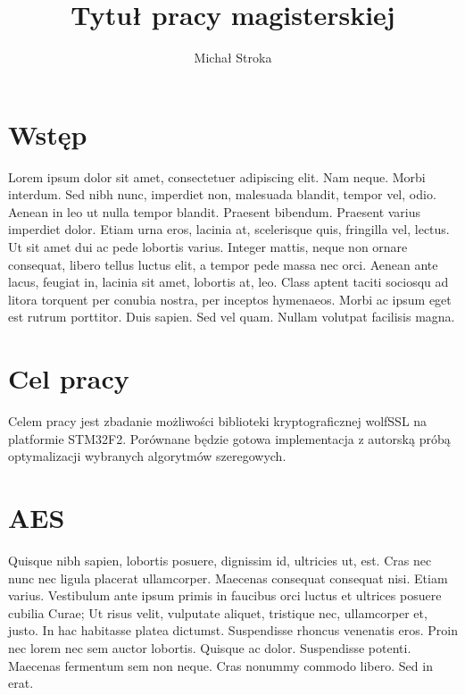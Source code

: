 \documentclass[printmode]{mgr}
\title{Tytuł pracy magisterskiej}
\author{Michał Stroka}
\begin{document}

\maketitle 

\tableofcontents %

\chapter{Wstęp}
Lorem ipsum dolor sit amet, consectetuer adipiscing elit. Nam
neque. Morbi interdum. Sed nibh nunc, imperdiet non, malesuada
blandit, tempor vel, odio. Aenean in leo ut nulla tempor
blandit. Praesent bibendum. Praesent varius imperdiet dolor. Etiam
urna eros, lacinia at, scelerisque quis, fringilla vel, lectus. Ut sit
amet dui ac pede lobortis varius. Integer mattis, neque non ornare
consequat, libero tellus luctus elit, a tempor pede massa nec
orci. Aenean ante lacus, feugiat in, lacinia sit amet, lobortis at,
leo. Class aptent taciti sociosqu ad litora torquent per conubia
nostra, per inceptos hymenaeos. Morbi ac ipsum eget est rutrum
porttitor. Duis sapien. Sed vel quam. Nullam volutpat facilisis magna.

\chapter{Cel pracy}

Celem pracy jest zbadanie możliwości biblioteki kryptograficznej wolfSSL na platformie STM32F2.
Porównane będzie gotowa implementacja z autorską próbą optymalizacji wybranych algorytmów szeregowych.

\chapter{AES}
Quisque nibh sapien, lobortis posuere, dignissim id, ultricies ut,
est. Cras nec nunc nec ligula placerat ullamcorper. Maecenas consequat
consequat nisi. Etiam varius. Vestibulum ante ipsum primis in faucibus
orci luctus et ultrices posuere cubilia Curae; Ut risus velit,
vulputate aliquet, tristique nec, ullamcorper et, justo. In hac
habitasse platea dictumst. Suspendisse rhoncus venenatis eros. Proin
nec lorem nec sem auctor lobortis. Quisque ac dolor. Suspendisse
potenti. Maecenas fermentum sem non neque. Cras nonummy commodo
libero. Sed in erat.
\end{document}

